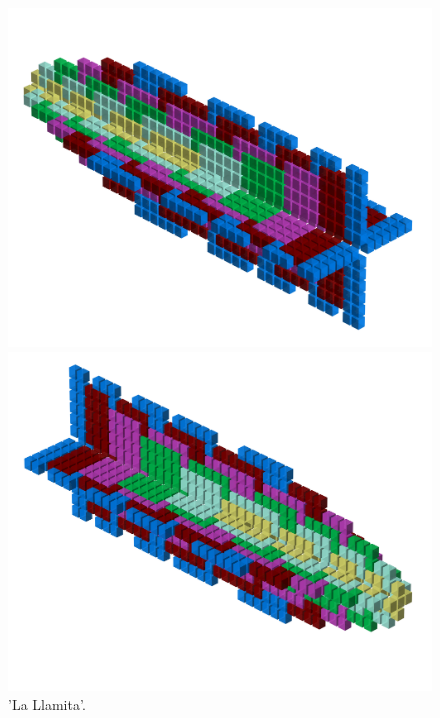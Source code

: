 \begin{figure}[H]
    \centering
    \begin{adjustbox}{width=12cm,center}
      \includegraphics[width=12cm]{src/patterns/pattern7-45.png}%
    \end{adjustbox}
    \begin{adjustbox}{width=12cm,margin=0cm -4cm}
      \includegraphics[width=12cm]{src/patterns/pattern7-225.png}%
    \end{adjustbox}
\caption{'La Llamita'.}
\end{figure}
\clearpage


